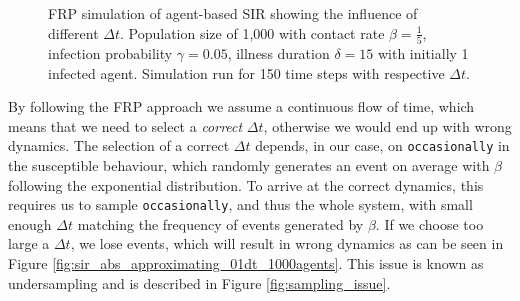 \begin{figure}
\begin{center}
	\caption[FRP simulation of agent-based SIR showing the influence of different $\Delta t$]{FRP simulation of agent-based SIR showing the influence of different $\Delta t$. Population size of 1,000 with contact rate $\beta = \frac{1}{5}$, infection probability $\gamma = 0.05$, illness duration $\delta = 15$ with initially 1 infected agent. Simulation run for 150 time steps with respective $\Delta t$.} 
	\label{fig:sir_abs_dynamics_frp}
\end{center}
\end{figure}

By following the FRP approach we assume a continuous flow of time, which means that we need to select a \textit{correct} $\Delta t$, otherwise we would end up with wrong dynamics. The selection of a correct $\Delta t$ depends, in our case, on \texttt{occasionally} in the susceptible behaviour, which randomly generates an event on average with $\beta$ following the exponential distribution. To arrive at the correct dynamics, this requires us to sample \texttt{occasionally}, and thus the whole system, with small enough $\Delta t$ matching the frequency of events generated by $\beta$. If we choose too large a $\Delta t$, we lose events, which will result in wrong dynamics as can be seen in Figure \ref{fig:sir_abs_approximating_01dt_1000agents}. This issue is known as undersampling and is described in Figure \ref{fig:sampling_issue}.

